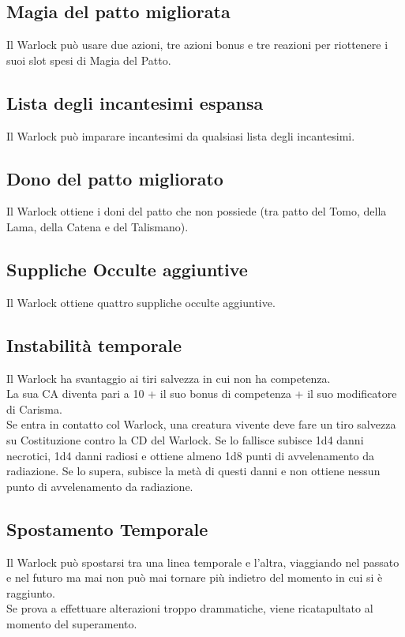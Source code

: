 \subsection{Magia del patto migliorata}
Il Warlock può usare due azioni, tre azioni bonus e tre reazioni per riottenere i suoi slot spesi di Magia del Patto.

\subsection{Lista degli incantesimi espansa}
Il Warlock può imparare incantesimi da qualsiasi lista degli incantesimi.

\subsection{Dono del patto migliorato}
Il Warlock ottiene i doni del patto che non possiede (tra patto del Tomo, della Lama, della Catena e del Talismano).

\subsection{Suppliche Occulte aggiuntive}
Il Warlock ottiene quattro suppliche occulte aggiuntive.

\subsection{Instabilità temporale}
Il Warlock ha svantaggio ai tiri salvezza in cui non ha competenza.\\
La sua CA diventa pari a 10 + il suo bonus di competenza + il suo modificatore di Carisma.\\
Se entra in contatto col Warlock, una creatura vivente deve fare un tiro salvezza su Costituzione contro la CD del Warlock. Se lo fallisce subisce 1d4 danni necrotici, 1d4 danni radiosi e ottiene almeno 1d8 punti di avvelenamento da radiazione. Se lo supera, subisce la metà di questi danni e non ottiene nessun punto di avvelenamento da radiazione.

\subsection{Spostamento Temporale}
Il Warlock può spostarsi tra una linea temporale e l'altra, viaggiando nel passato e nel futuro ma mai non può mai tornare più indietro del momento in cui si è raggiunto.\\
Se prova a effettuare alterazioni troppo drammatiche, viene ricatapultato al momento del superamento.
